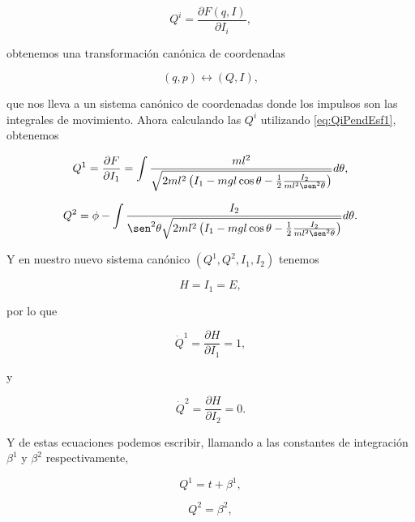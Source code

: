 \documentclass[a4paper,10pt]{article}
\numberwithin{equation}{section}
\begin{document}
\begin{equation}
 Q^i = \frac{\partial F(q,I)}{\partial I_i},
 \label{eq:QiPendEsf1}
\end{equation}

obtenemos una transformación canónica de coordenadas 

\begin{equation}
 (q,p) \leftrightarrow (Q,I),
\end{equation}

que nos lleva a un sistema canónico de coordenadas donde los impulsos son las 
integrales de movimiento. Ahora calculando las $Q^i$ utilizando \eqref{eq:QiPendEsf1}, 
obtenemos 

\begin{equation}
 Q^1 = \frac{\partial F}{\partial I_1} = \int \frac{ml^2}{\sqrt{2ml^2\left(I_1 -
 mgl\cos{\theta} - \frac{1}{2}\frac{I_2}{ml^2\sen^2{\theta}} \right)}}d\theta,
 \label{eq:Q1PendEsf1}
\end{equation}

\begin{equation}
 Q^2 = \phi - \int \frac{I_2}{\sen^2{\theta}\sqrt{2ml^2\left(I_1 - mgl\cos{\theta} - 
 \frac{1}{2}\frac{I_2}{ml^2\sen^2{\theta}} \right)}}d\theta.
 \label{eq:Q2PendEsf2}
\end{equation}

Y en nuestro nuevo sistema canónico $(Q^1,Q^2,I_1,I_2)$ tenemos 

\begin{equation}
 H = I_1 = E,
\end{equation}

por lo que 

\begin{equation}
 \dot{Q}^1 = \frac{\partial H}{\partial I_1} = 1,
\end{equation}

y 

\begin{equation}
 \dot{Q}^2 = \frac{\partial H}{\partial I_2} = 0.
\end{equation}

Y de estas ecuaciones podemos escribir, llamando a las constantes de integración 
$\beta^1$ y $\beta^2$ respectivamente, 

\begin{equation}
 Q^1 = t + \beta^1,
\end{equation}

\begin{equation}
 Q^2 = \beta^2,
\end{equation}
\end{document}
